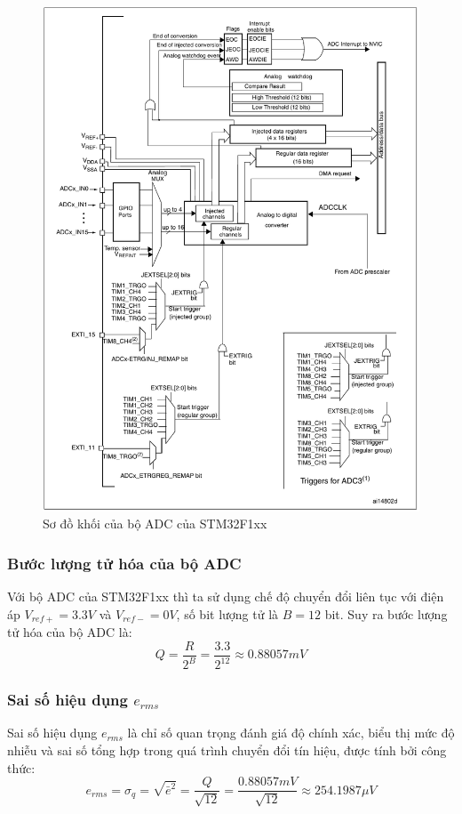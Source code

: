 \begin{figure}[H]
	\centering
	\includegraphics[width=0.7\linewidth]{./picture/Single ADC block diagram.pdf}
	\caption{Sơ đồ khối của bộ ADC của STM32F1xx}
	\label{f_single adc block diagram}
\end{figure}



\subsubsection{Bước lượng tử hóa của bộ ADC}

Với bộ ADC của STM32F1xx thì ta sử dụng chế độ chuyển đổi liên tục với điện áp $V_{ref+} = 3.3V$ và $V_{ref-} = 0V$, số bit lượng tử là $B= 12$ bit. Suy ra bước lượng tử hóa của bộ ADC là: \[ Q = \dfrac{R}{2^{B}} = \dfrac{3.3}{2^{12}} \approx 0.88057mV \]

\subsubsection{Sai số hiệu dụng $e_{rms}$}

Sai số hiệu dụng $e_{rms}$ là chỉ số quan trọng đánh giá độ chính xác, biểu thị mức độ nhiễu và sai số tổng hợp trong quá trình chuyển đổi tín hiệu, được tính bởi công thức: \[ e_{rms} = \sigma_{q} = \sqrt{\bar{e}^{2}} = \dfrac{Q}{\sqrt{12}} = \dfrac{0.88057mV}{\sqrt{12}} \approx 254.1987 \mu V \]

